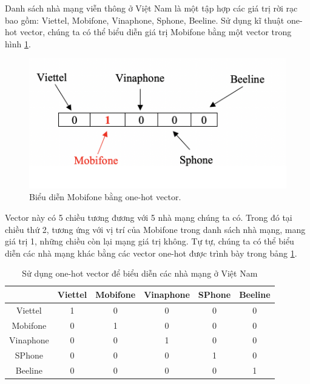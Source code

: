Danh sách nhà mạng viễn thông ở Việt Nam là một tập hợp các giá trị rời rạc bao gồm: Viettel, Mobifone, Vinaphone, Sphone, Beeline. Sử dụng kĩ thuật one-hot vector, chúng ta có thể biểu diễn giá trị Mobifone bằng một vector trong hình \ref{fig:mobifone-onthot}.

\begin{figure}[h!]
\begin{center}
	\includegraphics[width=1.0\textwidth]{chapter04/figure/mobifone-onehot.png}
	\caption{Biểu diễn Mobifone bằng one-hot vector.}
	\label{fig:mobifone-onthot}
\end{center}
\end{figure}

Vector này có 5 chiều tương đương với 5 nhà mạng chúng ta có. Trong đó tại chiều thứ 2, tương ứng với vị trí của Mobifone trong danh sách nhà mạng, mang giá trị 1, những chiều còn lại mạng giá trị không. Tự tự, chúng ta có thể biểu diễn các nhà mạng khác bằng các vector one-hot được trình bày trong bảng \ref{table:one-hot-vector-example}.

\begin{table}[h!]
    \centering
    \begin{tabular}{ |c|c|c|c|c|c| } 
    \hline
         & Viettel & Mobifone & Vinaphone & SPhone & Beeline \\
    \hline
        Viettel & 1 & 0 & 0 & 0 & 0 \\
        Mobifone & 0 & 1 & 0 & 0 & 0\\
        Vinaphone & 0 & 0 & 1 & 0 & 0\\
        SPhone & 0 & 0 & 0 & 1 & 0\\
        Beeline & 0 & 0 & 0 & 0 & 1 \\
    \hline
    \end{tabular}
    \caption{Sử dụng one-hot vector để biểu diễn các nhà mạng ở Việt Nam}
    \label{table:one-hot-vector-example}
\end{table}

